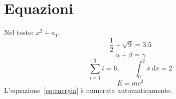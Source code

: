 \documentclass[a4paper,11pt]{article} %
\begin{document}
%

\section{Equazioni} %
Nel testo: $x^{2}+a_{1}$. %
\[ %
  \frac{1}{2}+\sqrt{9}=3.5 %
\] %
\[ %
  \alpha+\beta=\gamma %
\] %
\[ %
  \sum_{i=1}^{3}i=6,\qquad \int_{0}^{2} x\,dx=2 %
\] %
\begin{equation} %
  E=m c^{2} %
  \label{eq:energia} %
\end{equation} %
L'equazione~\eqref{eq:energia} %
è numerata automaticamente. %
\end{document}
